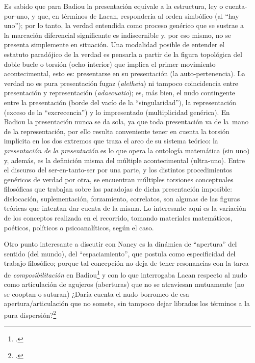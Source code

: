 Es sabido que para Badiou la presentación equivale a la estructura, ley o cuenta-por-uno, y que, en términos de Lacan, respondería al orden simbólico (al \enquote{hay uno}); por lo tanto, la verdad entendida como proceso genérico que se sustrae a la marcación diferencial significante es indiscernible y, por eso mismo, no se presenta simplemente en situación. Una modalidad posible de entender el estatuto paradójico de la verdad es pensarla a partir de la figura topológica del doble bucle o torsión (ocho interior) que implica el primer movimiento acontecimental, esto es: presentarse en su presentación (la auto-pertenencia). La verdad no es pura presentación fugaz (\emph{aletheia}) ni tampoco coincidencia entre presentación y representación (\emph{adaecuatio}); es, más bien, el nudo contingente  entre la presentación (borde del vacío de la \enquote{singularidad}), la representación (exceso de la \enquote{excrecencia}) y lo impresentado (multiplicidad genérica). En Badiou la presentación nunca se da sola, ya que toda presentación va de la~mano de la representación, por ello resulta conveniente tener en cuenta la torsión implícita en los dos extremos que traza el arco de su sistema teórico: la \emph{presentación de la presentación} es lo que opera la ontología matemática (sin uno) y, además, es la definición misma del múltiple acontecimental (ultra-uno). Entre el discurso del ser-en-tanto-ser por una parte, y los distintos procedimientos genéricos de verdad por otra, se encuentran múltiples torsiones conceptuales filosóficas que trabajan sobre las paradojas de dicha presentación imposible: dislocación, suplementación, forzamiento, correlatos, son algunas de las figuras teóricas que intentan dar cuenta de la misma. Lo interesante aquí es la variación de los conceptos realizada en el recorrido, tomando materiales matemáticos, poéticos, políticos o psicoanalíticos, según el caso.

Otro punto interesante a discutir con Nancy es la dinámica de \enquote{apertura} del sentido (del mundo), del \enquote{espaciamiento}, que postula como especificidad del trabajo filosófico; porque tal concepción no deja de tener resonancias con la tarea de \emph{composibilitación} en Badiou\footcite{@7072-BADIOU2002,@7126-BADIOU2007} y con lo que interrogaba Lacan respecto al nudo como articulación de agujeros (aberturas) que no se atraviesan mutuamente (no se cooptan o suturan) ¿Daría cuenta el nudo borromeo de esa apertura/articulación que no somete, sin tampoco dejar librados los términos a la pura dispersión?\footcite[23]{@7012-NANCY2009}

